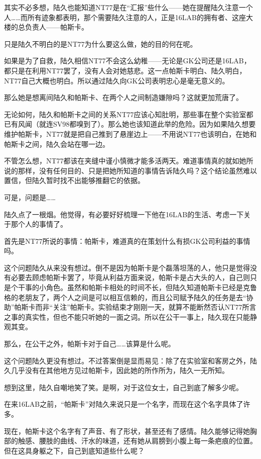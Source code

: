 其实不必多想，陆久也能知道NT77是在“汇报”些什么——她在提醒陆久注意一个人……而所有迹象都表明，那个需要陆久注意的人，正是16LAB的拥有者、这座大楼的总负责人——帕斯卡。

只是陆久不明白的是NT77为什么要这么做，她的目的何在呢。

如果是为了自救，陆久相信NT77不会这么幼稚——无论是GK公司还是16LAB，都只是在利用NT77罢了，没有人会对她慈悲。这一点帕斯卡明白、陆久明白，NT77自己大概也明白。所以通过陆久向GK公司表明忠心是毫无意义的。

那么她是想离间陆久和帕斯卡、在两个人之间制造嫌隙吗？这就更加荒唐了。

无论如何，陆久和帕斯卡之间的关系NT77应该心知肚明，那些事在整个实验室都已有风闻（就连SV98都嗅到了）。那么她也该知道此举的危险。因为如果陆久想要维护帕斯卡，NT77就是把自己推到了悬崖边上——不用说NT77也该明白，在她和帕斯卡之间，陆久会站在哪一边。

不管怎么想，NT77都该在夹缝中谨小慎微才能多活两天。难道事情真的就如她所说的那样，没有任何目的、只是把她所知道的事情告诉陆久吗？这个结论虽然难以置信，但陆久暂时找不出能够推翻它的依据。

可是，问题是……

陆久点了一根烟。他觉得，有必要好好梳理一下他在16LAB的生活、考虑一下关于那个人的事情了。

首先是NT77所说的事情：帕斯卡，难道真的在策划什么有损GK公司利益的事情吗。

这个问题陆久从来没有想过。倒不是因为帕斯卡是个磊落坦荡的人，他只是觉得没有必要去顾虑帕斯卡罢了，毕竟从利益方面来说，帕斯卡是占大头的人，自己则只是个干事的小角色。虽然和帕斯卡相处的时间不长，但陆久知道帕斯卡已经是克鲁格的老朋友了，两个人之间是可以相互信赖的，而且公司赋予陆久的任务是去“协助”帕斯卡而非“关注”帕斯卡。实验结束才刚刚一天，就算不能断然否认NT77所言之事的真实性，但也不能只听她的一面之词。所以在公干一事上，陆久现在只能静观其变。

那么，在公干之外，帕斯卡对于自己……该算是什么呢。

这个问题陆久更没有想过。不过答案倒是显而易见：除了在实验室和客房之外，陆久几乎没有在其他地方见过帕斯卡，因此她的所作所为，陆久一无所知。

想到这里，陆久自嘲地笑了笑。是啊，对于这位女士，自己到底了解多少呢。

在来16LAB之前，“帕斯卡”对陆久来说只是一个名字，而现在这个名字具体了许多。

现在，帕斯卡这个名字有了声音、有了形状，甚至还有了感情。陆久能够记得她胸部的触感、腰肢的曲线、汗水的味道，还有她从肩膀到小腹上每一条疤痕的位置。但在这具身躯之下，自己到底知道些什么呢？ 

